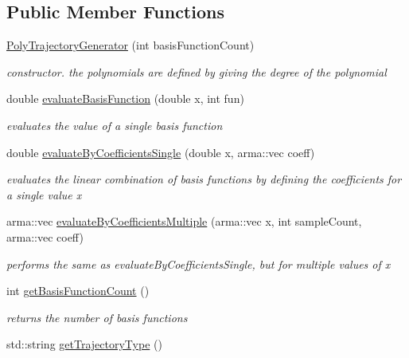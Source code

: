 \subsection*{Public Member Functions}
\begin{DoxyCompactItemize}
\item 
\hyperlink{classkukadu_1_1PolyTrajectoryGenerator_aaae3f21fde5c8bef81f3cc9eb365fcfb}{Poly\+Trajectory\+Generator} (int basis\+Function\+Count)
\begin{DoxyCompactList}\small\item\em constructor. the polynomials are defined by giving the degree of the polynomial \end{DoxyCompactList}\item 
double \hyperlink{classkukadu_1_1PolyTrajectoryGenerator_aaad5efdc0b4a8a4e55db0ffcfd7939f7}{evaluate\+Basis\+Function} (double x, int fun)
\begin{DoxyCompactList}\small\item\em evaluates the value of a single basis function \end{DoxyCompactList}\item 
double \hyperlink{classkukadu_1_1PolyTrajectoryGenerator_a3ce8a84b6a838a73708414baf2a688ba}{evaluate\+By\+Coefficients\+Single} (double x, arma\+::vec coeff)
\begin{DoxyCompactList}\small\item\em evaluates the linear combination of basis functions by defining the coefficients for a single value x \end{DoxyCompactList}\item 
arma\+::vec \hyperlink{classkukadu_1_1PolyTrajectoryGenerator_a00a575cf44a1b0061131227baae4f593}{evaluate\+By\+Coefficients\+Multiple} (arma\+::vec x, int sample\+Count, arma\+::vec coeff)
\begin{DoxyCompactList}\small\item\em performs the same as evaluate\+By\+Coefficients\+Single, but for multiple values of x \end{DoxyCompactList}\item 
int \hyperlink{classkukadu_1_1PolyTrajectoryGenerator_ae8578365c5ae221c8cf14208b74c8975}{get\+Basis\+Function\+Count} ()\hypertarget{classkukadu_1_1PolyTrajectoryGenerator_ae8578365c5ae221c8cf14208b74c8975}{}\label{classkukadu_1_1PolyTrajectoryGenerator_ae8578365c5ae221c8cf14208b74c8975}

\begin{DoxyCompactList}\small\item\em returns the number of basis functions \end{DoxyCompactList}\item 
std\+::string \hyperlink{classkukadu_1_1PolyTrajectoryGenerator_adb937d18031924c54829977211e1d250}{get\+Trajectory\+Type} ()\hypertarget{classkukadu_1_1PolyTrajectoryGenerator_adb937d18031924c54829977211e1d250}{}\label{classkukadu_1_1PolyTrajectoryGenerator_adb937d18031924c54829977211e1d250}


\end{DoxyCompactItemize}
